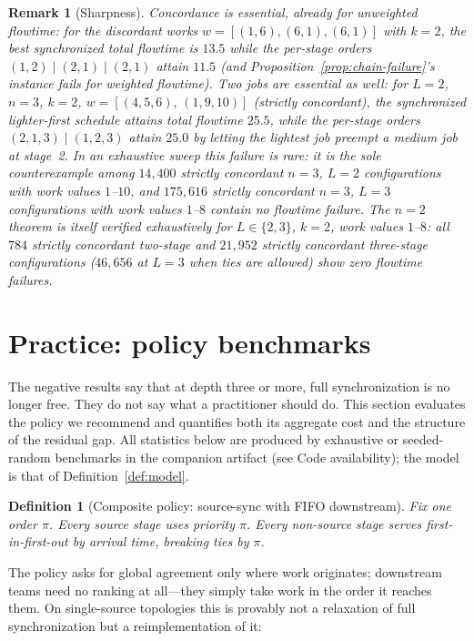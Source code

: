 \documentclass[sn-mathphys,NameDate]{sn-jnl}
\theoremstyle{thmstyleone}
\theoremstyle{thmstylethree}
\newtheorem{definition}[theorem]{Definition}
\theoremstyle{thmstyletwo}
\newtheorem{remark}[theorem]{Remark}
\begin{document}
\begin{remark}[Sharpness]
\label{rem:flowtime-sharp}
Concordance is essential, already for unweighted flowtime: for
the discordant works $w = [(1,6),(6,1),(6,1)]$ with $k = 2$,
the best synchronized total flowtime is $13.5$ while the
per-stage orders $(1,2) \mid (2,1) \mid (2,1)$ attain $11.5$
(and Proposition~\ref{prop:chain-failure}'s instance fails for
weighted flowtime). Two jobs are essential as well: for $L = 2$,
$n = 3$, $k = 2$, $w = [(4,5,6),\,(1,9,10)]$ (strictly
concordant), the synchronized lighter-first schedule attains
total flowtime $25.5$, while the per-stage orders
$(2,1,3) \mid (1,2,3)$ attain $25.0$ by letting the lightest
job preempt a medium job at stage~2. In an exhaustive sweep
this failure is rare: it is the sole counterexample among
$14{,}400$ strictly concordant $n = 3$, $L = 2$ configurations
with work values $1$--$10$, and $175{,}616$ strictly
concordant $n = 3$, $L = 3$ configurations with work values
$1$--$8$ contain no flowtime failure. The $n = 2$ theorem is
itself verified exhaustively for $L \in \{2, 3\}$, $k = 2$,
work values $1$--$8$: all $784$ strictly concordant two-stage
and $21{,}952$ strictly concordant three-stage configurations
($46{,}656$ at $L = 3$ when ties are allowed) show zero
flowtime failures.
\end{remark}

\section{Practice: policy benchmarks}
\label{sec:practice}

The negative results say that at depth three or more, full
synchronization is no longer free. They do not say what a
practitioner should do. This section evaluates the policy we
recommend and quantifies both its aggregate cost and the
structure of the residual gap. All statistics below are
produced by exhaustive or seeded-random benchmarks in the
companion artifact (see Code availability); the model is that
of Definition~\ref{def:model}.

\begin{definition}[Composite policy: source-sync with FIFO
downstream]
\label{def:composite}
Fix one order $\pi$. Every source stage uses priority $\pi$.
Every non-source stage serves first-in-first-out by arrival
time, breaking ties by $\pi$.
\end{definition}

The policy asks for global agreement only where work
originates; downstream teams need no ranking at all---they
simply take work in the order it reaches them. On
single-source topologies this is provably not a relaxation of
full synchronization but a reimplementation of it:
\end{document}
